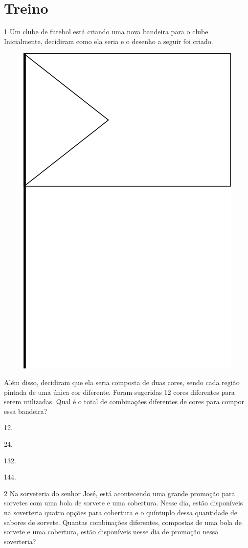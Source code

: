 \begin{mdframed}[linewidth=2pt,linecolor=salmao,roundcorner=2pt]
\vspace{2cm}
\end{mdframed}

\section*{Treino}

\num{1} Um clube de futebol está criando uma nova bandeira para o clube.
Inicialmente, decidiram como ela seria e o desenho a seguir foi criado.

\begin{figure}[htpb!]
\centering
\includegraphics[width=.2\textwidth]{media/image74.png}
\end{figure}

Além disso, decidiram que ela seria composta de duas cores, sendo cada
região pintada de uma única cor diferente. Foram sugeridas 12 cores
diferentes para serem utilizadas. Qual é o total de combinações
diferentes de cores para compor essa bandeira?

\begin{multicols}{2}
\begin{escolha}
\item
  12.
\item
  24.
\item
  132.
\item
  144.
\end{escolha}
\end{multicols}

\num{2} Na sorveteria do senhor José, está acontecendo uma grande promoção para
sorvetes com uma bola de sorvete e uma cobertura. Nesse dia, estão
disponíveis na soverteria quatro opções para cobertura e o quíntuplo dessa
quantidade de sabores de sorvete. Quantas combinações diferentes, compostas de uma bola de
sorvete e uma cobertura, estão disponíveis nesse dia de promoção nessa
soverteria?

